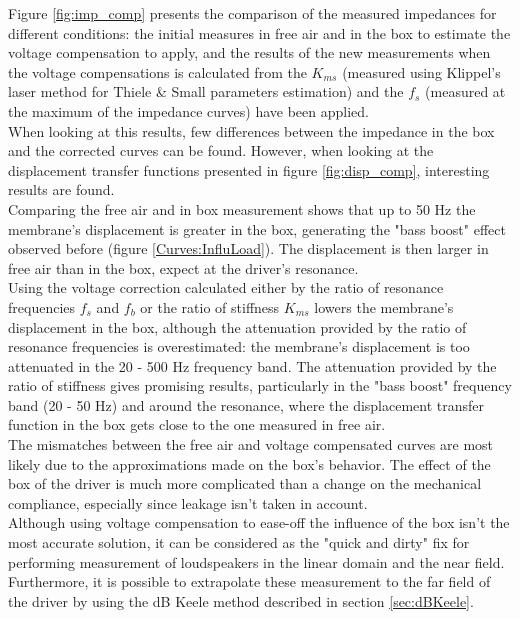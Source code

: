 \documentclass{report}
\begin{document}
Figure \ref{fig:imp_comp} presents the comparison of the measured impedances for different conditions: the initial measures in free air and in the box to estimate the voltage compensation to apply, and the results of the new measurements when the voltage compensations is calculated from the $K_{ms}$ (measured using Klippel's laser method for Thiele \& Small parameters estimation) and the $f_{s}$ (measured at the maximum of the impedance curves) have been applied. \\
When looking at this results, few differences between the impedance in the box and the corrected curves can be found. However, when looking at the displacement transfer functions presented in figure \ref{fig:disp_comp}, interesting results are found. \\

Comparing the free air and in box measurement shows that up to 50 Hz the membrane's displacement is greater in the box, generating the "bass boost" effect observed before (figure \ref{Curves:InfluLoad}). The displacement is then larger in free air than in the box, expect at the driver's resonance.\\
Using the voltage correction calculated either by the ratio of resonance frequencies $f_{s}$ and $f_{b}$ or the ratio of stiffness $K_{ms}$ lowers the membrane's displacement in the box, although the attenuation provided by the ratio of resonance frequencies is overestimated: the membrane's displacement is too attenuated in the 20 - 500 Hz frequency band. The attenuation provided by the ratio of stiffness gives promising results, particularly in the "bass boost" frequency band (20 - 50 Hz) and around the resonance, where the displacement transfer function in the box gets close to the one measured in free air. \\

The mismatches between the free air and voltage compensated curves are most likely due to the approximations made on the box's behavior. The effect of the box of the driver is much more complicated than a change on the mechanical compliance, especially since leakage isn't taken in account.  \\

Although using voltage compensation to ease-off the influence of the box isn't the most accurate solution, it can be considered as the "quick and dirty" fix for performing measurement of loudspeakers in the linear domain and the near field. Furthermore, it is possible to extrapolate these measurement to the far field of the driver by using the dB Keele method described in section \ref{sec:dBKeele}.
\end{document}
